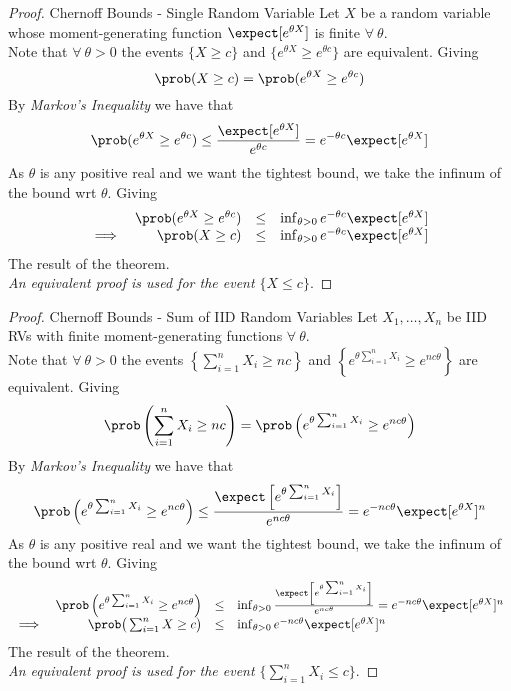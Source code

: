 \documentclass[11pt,a4paper]{article}
\begin{document}
  \begin{proof}{Chernoff Bounds - Single Random Variable}
    Let $X$ be a random variable whose moment-generating function $\expect[e^{\theta X}]$ is finite $\forall\ \theta$.\\
    Note that $\forall\ \theta>0$ the events $\big\{X\geq c\big\}$ and $\big\{e^{\theta X}\geq e^{\theta c}\big\}$ are equivalent. Giving
    \[ \prob(X\geq c)=\prob(e^{\theta X}\geq e^{\theta c}) \]
    By \textit{Markov's Inequality} we have that
    \[ \prob(e^{\theta X}\geq e^{\theta c})\leq\frac{\expect[e^{\theta X}]}{e^{\theta c}}=e^{-\theta c}\expect[e^{\theta X}] \]
    As $\theta$ is any positive real and we want the tightest bound, we take the infinum of the bound wrt $\theta$. Giving
    \[\begin{array}{rrcl}
      &\prob(e^{\theta X}\geq e^{\theta c})&\leq&\inf_{\theta>0}e^{-\theta c}\expect[e^{\theta X}]\\
      \implies&\prob(X\geq c)&\leq&\inf_{\theta>0}e^{-\theta c}\expect[e^{\theta X}]
    \end{array}\]
    The result of the theorem.\proved\\
    \textit{An equivalent proof is used for the event $\{X\leq c\}$}.
  \end{proof}

  \begin{proof}{Chernoff Bounds - Sum of IID Random Variables}
    Let $X_1,\dots,X_n$ be IID RVs with finite moment-generating functions $\forall\ \theta$.\\
    Note that $\forall\ \theta>0$ the events $\left\{\sum_{i=1}^nX_i\geq nc\right\}$ and $\left\{e^{\theta\sum_{i=1}^nX_i}\geq e^{nc\theta}\right\}$ are equivalent. Giving
    \[ \prob\left(\sum_{i=1}^nX_i\geq nc\right)=\prob\left(e^{\theta\sum_{i=1}^nX_i}\geq e^{nc\theta}\right) \]
    By \textit{Markov's Inequality} we have that
    \[ \prob\left(e^{\theta\sum_{i=1}^nX_i}\geq e^{nc\theta}\right)\leq\frac{\expect\left[e^{\theta\sum_{i=1}^nX_i}\right]}{e^{nc\theta}}=e^{-nc\theta}\expect[e^{\theta X}]^n \]
    As $\theta$ is any positive real and we want the tightest bound, we take the infinum of the bound wrt $\theta$. Giving
    \[\begin{array}{rrcl}
      &\prob\left(e^{\theta\sum_{i=1}^nX_i}\geq e^{nc\theta}\right)&\leq&\inf_{\theta>0}\frac{\expect\left[e^{\theta\sum_{i=1}^nX_i}\right]}{e^{nc\theta}}=e^{-nc\theta}\expect[e^{\theta X}]^n\\
      \implies&\prob\big(\sum_{i=1}^nX\geq c\big)&\leq&\inf_{\theta>0}e^{-nc\theta}\expect[e^{\theta X}]^n
    \end{array}\]
    The result of the theorem.\proved\\
    \textit{An equivalent proof is used for the event $\big\{\sum_{i=1}^nX_i\leq c\big\}$}.
  \end{proof}
\end{document}
